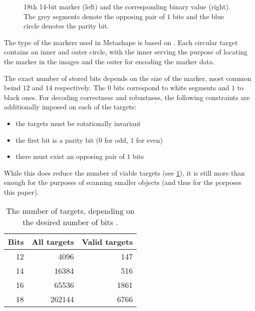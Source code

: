 \begin{figure}
	\centering
	
	\caption{18th 14-bit marker (left) and the corresponding binary value (right). The grey segments denote the opposing pair of $1$ bits and the blue circle denotes the parity bit.}
\end{figure}

The type of the markers used in Metashape is based on \citet{schneider19913,borisPatent}.
Each circular target contains an inner and outer circle, with the inner serving the purpose of locating the marker in the images and the outer for encoding the marker data.

The exact number of stored bits depends on the size of the marker, most common beind $12$ and $14$ respectively.
The $0$ bits correspond to white segments and $1$ to black ones.
For decoding correctness and robustness, the following constraints are additionally imposed on each of the targets:

\begin{itemize}
	\item the targets must be rotationally invariant
	\item the first bit is a parity bit ($0$ for odd, $1$ for even)
	\item there must exist an opposing pair of $1$ bits
\end{itemize}

While this does reduce the number of viable targets (see \cref{tab:markers}), it is still more than enough for the purposes of scanning smaller objects (and thus for the porposes this paper).

\begin{table}
\centering\footnotesize\sf
\begin{tabular}{rrr}
\toprule
Bits & All targets & Valid targets \\
\midrule
12 & 4096   & 147 \\
14 & 16384  & 516 \\
16 & 65536  & 1861 \\
18 & 262144 & 6766 \\
\bottomrule
\end{tabular}
\caption{The number of targets, depending on the desired number of bits \cite{targetsPost}.}
\label{tab:markers}
\end{table}
